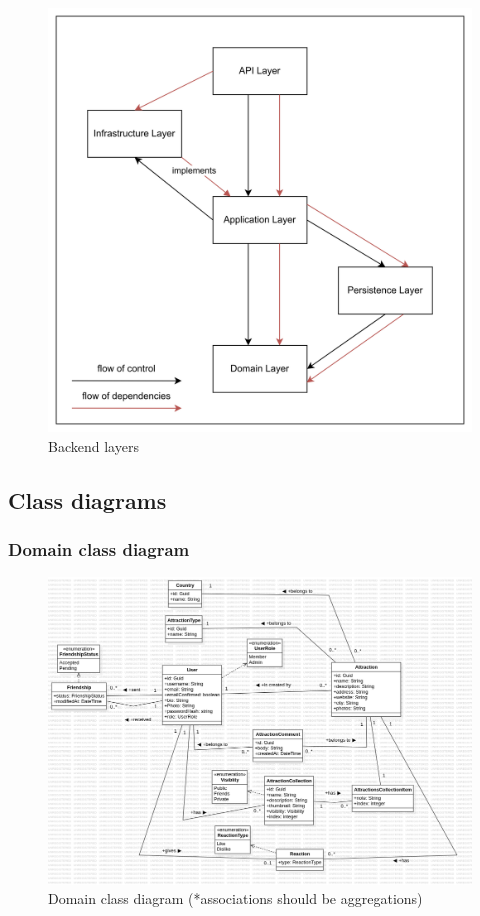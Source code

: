 \begin{figure}[!ht]
    \centering
    \includegraphics[width=0.96\linewidth]{backend-layers-with-flow-of-control.png}
    \caption{Backend layers}
    \label{fig:enter-label}
\end{figure}


\subsection{Class diagrams}

\subsubsection{Domain class diagram}

\begin{figure}[!ht]
    \centering
    \includegraphics[width=1\linewidth]{domain-class-diagram.png}
    \caption{Domain class diagram (*associations should be aggregations)}
    \label{fig:enter-label}
\end{figure}

